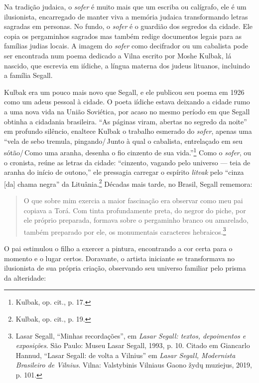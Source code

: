 Na tradição judaica, o \textit{sofer}
é muito mais que um escriba ou calígrafo, ele é um ilusionista,
encarregado de manter viva a memória judaica transformando letras
sagradas em personas. No fundo, o \textit{sofer} é o guardião dos segredos da
cidade. Ele copia os pergaminhos sagrados mas também redige documentos
legais para as famílias judias locais. A imagem do \textit{sofer} como decifrador ou um cabalista pode ser encontrada num poema dedicado a Vilna escrito por Moshe Kulbak,
lá nascido, que escrevia em iídiche, a língua materna dos judeus
lituanos, incluindo a família Segall. 

Kulbak era um pouco mais novo que
Segall, e ele publicou seu poema em 1926 como um adeus pessoal à cidade.
O poeta iídiche estava deixando a cidade rumo a uma nova vida na União
Soviética, por acaso no mesmo período em que Segall obtinha a cidadania
brasileira. ``As páginas viram, abertas no segredo da noite'' em
profundo silêncio, enaltece Kulbak o trabalho esmerado do \textit{sofer}, apenas
uma ``vela de sebo tremula, pingando/\,Junto à qual o cabalista,
entrelaçado em seu sótão/\,Como uma aranha, desenha o fio cinzento de
sua vida.''\footnote{Kulbak, op. cit., p. 17.} Como o \textit{sofer}, ou o cronista, reúne
as letras da cidade: ``cinzento, vagando pelo universo --- teia de aranha
do início de outono,'' ele pressagia carregar o espírito \textit{litvak} pelo
``cinza {[}da{]} chama negra'' da Lituânia.\footnote{Kulbak, op. cit., p. 19.}
Décadas mais tarde, no Brasil, Segall rememora: 

\begin{quote}
O que sobre mim
exercia a maior fascinação era observar como meu pai copiava a Torá. Com
tinta profundamente preta, do negror do piche, por ele próprio
preparada, formava sobre o pergaminho branco ou amarelado, também
preparado por ele, os monumentais caracteres hebraicos.\footnote{Lasar Segall, ``Minhas recordações'', em \textit{Lasar Segall: textos, depoimentos
  e exposições}. São Paulo: Museu Lasar Segall, 1993, p. 10. Citado em
  Giancarlo Hannud, ``Lasar Segall: de volta a Vilnius'' em \textit{Lasar
  Segall, Modernista Brasileiro de Vilnius}. Vilna: Valstybinis
  Vilniaus Gaono žydų muziejus, 2019, p. 101.} 
\end{quote}

O pai estimulou o filho a
exercer a pintura, encontrando a cor certa para o momento e o lugar
certos. Doravante, o artista iniciante se transformava no ilusionista de
sua própria criação, observando seu universo familiar pelo prisma da
alteridade:

